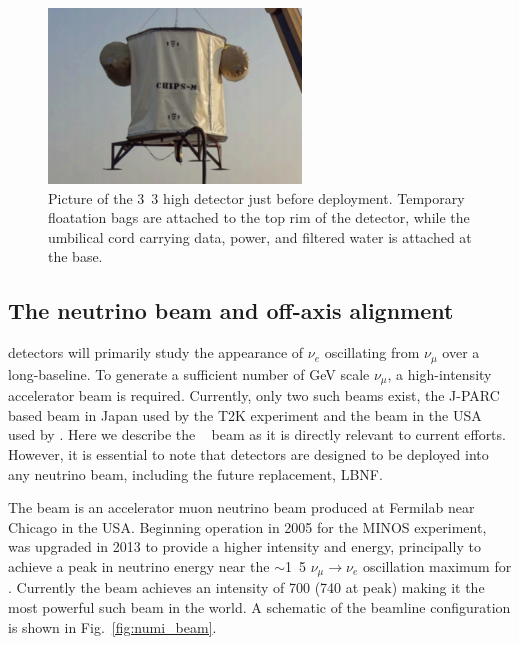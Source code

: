 \begin{figure} %
    \includegraphics[width=0.6\textwidth]{diagrams/4-chips/chips_m.pdf}
    \caption[Picture of the \chipsm detector]
    {Picture of the \unit{3.3}{} high \chipsm detector just before deployment. Temporary
        floatation bags are attached to the top rim of the detector, while the umbilical cord
        carrying data, power, and filtered water is attached at the base.}
    \label{fig:chips_m}
\end{figure}

\subsection{The neutrino beam and off-axis alignment} %
\label{sec:chips_concept_beam} %

\chips detectors will primarily study the appearance of $\nu_{e}$ oscillating from $\nu_{\mu}$
over a long-baseline. To generate a sufficient number of GeV scale $\nu_{\mu}$, a high-intensity
accelerator beam is required. Currently, only two such beams exist, the J-PARC based beam in Japan
used by the T2K experiment and the \numi beam in the USA used by \nova. Here we describe the
\numi~\cite{adamson2016} beam as it is directly relevant to current \chips efforts. However, it is
essential to note that \chips detectors are designed to be deployed into any neutrino beam,
including the future \numi replacement, LBNF.

The \numi beam is an accelerator muon neutrino beam produced at Fermilab near Chicago in the USA.
Beginning operation in 2005 for the MINOS experiment, \numi was upgraded in 2013 to provide a
higher intensity and energy, principally to achieve a peak in neutrino energy near the
$\sim$\unit{1.5}{\GeV} $\nu_{\mu}\rightarrow\nu_{e}$ oscillation maximum for \nova. Currently the
\numi beam achieves an intensity of \unit{700}{} (\unit{740}{} at peak)
making it the most powerful such beam in the world. A schematic of the \numi beamline
configuration is shown in Fig.~\ref{fig:numi_beam}.

